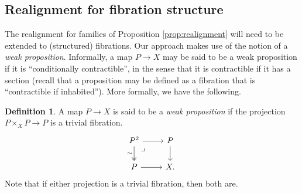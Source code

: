 \documentclass[11pt]{amsart}
\newcommand{\ra}{\ensuremath{\rightarrow}}
\renewcommand{\to}{\ensuremath{\rightarrow}}
\newcommand{\V}{\ensuremath{\mathcal{V}}}
\newcommand{\VV}{\ensuremath{\dot{\mathcal{V}}}}
\newcommand{\Fib}{\ensuremath{\mathsf{Fib}}}
\newcommand{\FFib}{\ensuremath{\dot{\mathsf{Fib}}}}
\newtheorem{lemma}[theorem]{Lemma}
\theoremstyle{remark}
\theoremstyle{definition}
\newtheorem{definition}[theorem]{Definition}
\newcommand{\pbmark}{\ar[dr, phantom, "\lrcorner" very near start, shift right=.5ex]}	%
\begin{document}


\subsection{Realignment for fibration structure}\label{sec:realignment}

The realignment for families of Proposition \ref{prop:realignment} will need to be extended to (structured) fibrations. Our approach makes use of the notion of a \emph{weak proposition}.  Informally, a map $P\to X$ may be said to be a weak proposition if it is ``conditionally contractible'', in the sense that it is contractible if it has a section (recall that a proposition may be defined as a fibration that is ``contractible if inhabited'').  More formally, we have the following.

\begin{definition}
A map $P\to X$ is said to be a \emph{weak proposition} if the projection $P\times_X P\to P$ is a trivial fibration.
\begin{equation}\label{diagram:weakprop}
\begin{tikzcd}
P^2 \ar[d,two heads,swap,"{\sim}"] \ar[r]  \pbmark & P \ar[d] \\
P \ar[r] &  X.
\end{tikzcd}
\end{equation}
Note that if either projection is a trivial fibration, then both are.
\end{definition}
\end{document}
